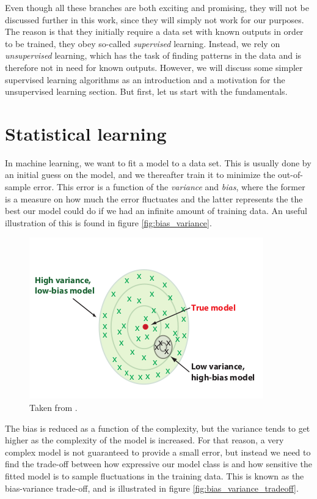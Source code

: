 Even though all these branches are both exciting and promising, they will not be discussed further in this work, since they will simply not work for our purposes. The reason is that they initially require a data set with known outputs in order to be trained, they obey so-called \textit{supervised} learning. Instead, we rely on \textit{unsupervised} learning, which has the task of finding patterns in the data and is therefore not in need for known outputs. However, we will discuss some simpler supervised learning algorithms as an introduction and a motivation for the unsupervised learning section. But first, let us start with the fundamentals. 

\section{Statistical learning}
In machine learning, we want to fit a model to a data set. This is usually done by an initial guess on the model, and we thereafter train it to minimize the out-of-sample error. This error is a function of the \textit{variance} and \textit{bias}, where the former is a measure on how much the error fluctuates and the latter represents the the best our model could do if we had an infinite amount of training data. An useful illustration of this is found in figure \eqref{fig:bias_variance}.
\begin{figure}[H]
	\centering
	\includegraphics[scale=0.6]{Images/bias_variance.png}
	\caption{Taken from \cite{mehta_high-bias_2019}.}
	\label{fig:bias_variance}
\end{figure}
The bias is reduced as a function of the complexity, but the variance tends to get higher as the complexity of the model is increased. For that reason, a very complex model is not guaranteed to provide a small error, but instead we need to find the trade-off between how expressive our model class is and how sensitive the fitted model is to sample fluctuations in the training data. This is known as the bias-variance trade-off, and is illustrated in figure \eqref{fig:bias_variance_tradeoff}.
